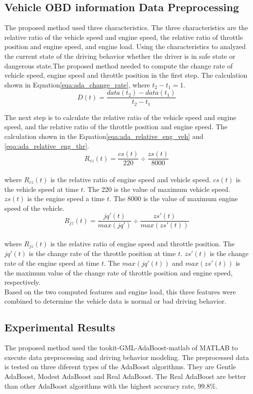 \subsection{Vehicle OBD information Data Preprocessing}
The proposed method used three characteristics. The three characteristics are the relative ratio of the vehicle speed and engine speed, the relative ratio of throttle position and engine speed, and engine load. Using the characteristics to analyzed the current state of the driving behavior whether the driver is in safe state or dangerous state.The proposed method needed to compute the change rate of vehicle speed, engine speed and throttle position in the first step. The calculation shown in Equation\eqref{eqa:ada_change_rate}, where $t_{2} - t_{1} = 1$.\\
\begin{equation}
\label{eqa:ada_change_rate}
D(t) = \dfrac{data(t_{2})-data(t_{1})}{t_{2}-t_{1}}
\end{equation}

The next step is to calculate the relative ratio of the vehicle speed and engine speed, and the relative ratio of the throttle position and engine speed. The calculation shown in the Equation\eqref{eqa:ada_relative_eng_veh} and \eqref{eqa:ada_relative_eng_thr}. \\
\begin{equation}
\label{eqa:ada_relative_eng_veh}
R_{cz}(t) = \dfrac{cs(t)}{220} \div \dfrac{zs(t)}{8000}
\end{equation}
\\
where $R_{cz}(t)$ is the relative ratio of engine speed and vehicle speed. $cs(t)$ is the vehicle speed at time $t$. The 220 is the value of maximum vehicle speed. $zs(t)$ is the engine speed a time $t$. The 8000 is the value of maximum engine speed of the vehicle.\\

\begin{equation}
\label{eqa:ada_relative_eng_thr}
R_{jz}(t) = \dfrac{jq'(t)}{max(jq')} \div \dfrac{zs'(t)}{max(zs'(t))}
\end{equation}
\\
where $R_{jz}(t)$ is the relative ratio of engine speed and throttle position. The $jq'(t)$ is the change rate of the throttle position at time $t$. $zs'(t)$ is the change rate of the engine speed at time $t$. The $max(jq'(t))$ and $max(zs'(t))$ is the maximum value of the change rate of throttle position and engine speed, respectively.\\

Based on the two computed features and engine load, this three features were combined to determine the vehicle data is normal or bad driving behavior.

\subsection{Experimental Results}
The proposed method used the tookit-GML-AdaBoost-matlab of MATLAB to execute data preprocessing and driving behavior modeling. The preprocessed data is tested on three diferent types of the AdaBoost algorithms. They are Gentle AdaBoost, Modest AdaBoost and Real AdaBoost. The Real AdaBoost are better than other AdaBoost algorithms with the highest accuracy rate, 99.8\%.